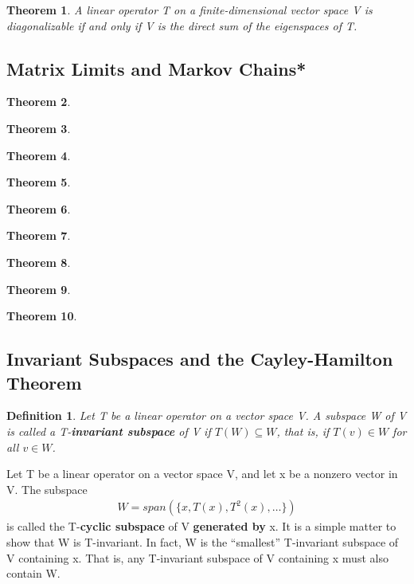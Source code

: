 \documentclass{article}
\newcommand{\bd}[1]{\textbf{#1}}
\theoremstyle{plain}
\newtheorem{theorem}{Theorem}[section]
\newtheorem*{definition1}{Definition}
\theoremstyle{plain} %
\begin{document}
\begin{theorem}
  A linear operator T on a finite-dimensional vector space V is diagonalizable if and only if V is the direct sum of the eigenspaces of T.
\end{theorem}

\subsection {Matrix Limits and Markov Chains*}

\begin{theorem}
\end{theorem}

\begin{theorem}
\end{theorem}

\begin{theorem}
\end{theorem}

\begin{theorem}
\end{theorem}

\begin{theorem}
\end{theorem}

\begin{theorem}
\end{theorem}

\begin{theorem}
\end{theorem}

\begin{theorem}
\end{theorem}

\begin{theorem}
\end{theorem}

\subsection {Invariant Subspaces and the Cayley-Hamilton Theorem}

\begin{definition1}
  Let T be a linear operator on a vector space V. A subspace W of V is called a T-\bd{invariant  subspace} of V if $T(W) \subseteq W$, that is, if $T(v) \in W$ for all $v \in W$.
\end{definition1}

Let T be a linear operator on a vector space V, and let x be a nonzero vector in V. The subspace
\begin{align*}
  W=span(\{x,T(x),T^2(x),\ldots\})
\end{align*}
is called the T-\bd{cyclic subspace} of V \bd{generated by} x. It is a simple matter to show that W is T-invariant. In fact, W is the “smallest” T-invariant subspace of V containing x. That is, any T-invariant subspace of V containing x must also contain W.
\end{document}
